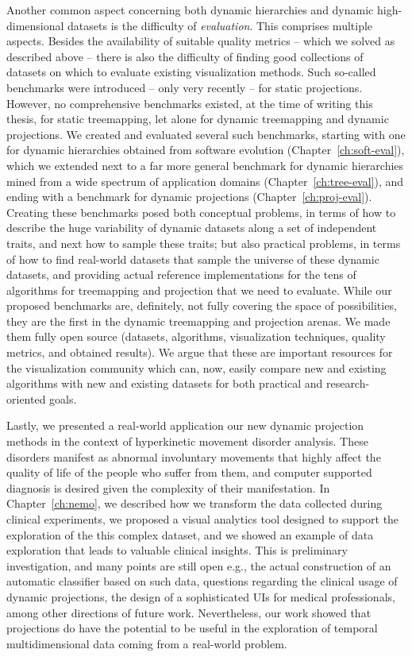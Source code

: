 Another common aspect concerning both dynamic hierarchies and dynamic high-dimensional datasets is the difficulty of \emph{evaluation}. This comprises multiple aspects. Besides the availability of suitable quality metrics -- which we solved as described above -- there is also the difficulty of finding good collections of datasets on which to evaluate existing visualization methods. Such so-called benchmarks were introduced -- only very recently -- for static projections. However, no comprehensive benchmarks existed, at the time of writing this thesis, for static treemapping, let alone for dynamic treemapping and dynamic projections. We created and evaluated several such benchmarks, starting with one for dynamic hierarchies obtained from software evolution (Chapter~\ref{ch:soft-eval}), which we extended next to a far more general benchmark for dynamic hierarchies mined from a wide spectrum of application domains (Chapter~\ref{ch:tree-eval}), and ending with a benchmark for dynamic projections (Chapter~\ref{ch:proj-eval}). 
Creating these benchmarks posed both conceptual problems, in terms of how to describe the huge variability of dynamic datasets along a set of independent traits, and next how to sample these traits; but also practical problems, in terms of how to find real-world datasets that sample the universe of these dynamic datasets, and providing actual reference implementations for the tens of algorithms for treemapping and projection that we need to evaluate. While our proposed benchmarks are, definitely, not fully covering the space of possibilities, they are the first in the dynamic treemapping and projection arenas. We made them fully open source (datasets, algorithms, visualization techniques, quality metrics, and obtained results). We argue that these are important resources for the visualization community which can, now, easily compare new and existing algorithms with new and existing datasets for both practical and research-oriented goals.

Lastly, we presented a real-world application our new dynamic projection methods in the context of hyperkinetic movement disorder analysis. These disorders manifest as abnormal involuntary movements that highly affect the quality of life of the people who suffer from them, and computer supported diagnosis is desired given the complexity of their manifestation. 
In Chapter~\ref{ch:nemo}, we described how we transform the data collected during clinical experiments, we proposed a visual analytics tool designed to support the exploration of the this complex dataset, and we showed an example of data exploration that leads to valuable clinical insights.
This is preliminary investigation, and many points are still open e.g., the actual construction of an automatic classifier based on such data, questions regarding the clinical usage of dynamic projections, the design of a sophisticated UIs for medical professionals, among other directions of future work. Nevertheless, our work showed that projections do have the potential to be useful in the exploration of temporal multidimensional data coming from a real-world problem.


